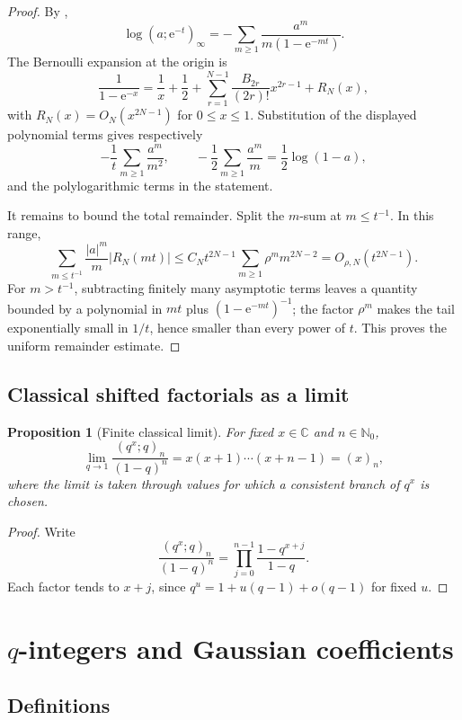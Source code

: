\documentclass[11pt,oneside,openany]{book}
\newtheorem{proposition}[theorem]{Proposition}
\theoremstyle{definition}
\theoremstyle{remark}
\newcommand{\C}{\mathbb C}
\newcommand{\N}{\mathbb N}
\newcommand{\e}{\mathrm e}
\newcommand{\abs}[1]{\lvert #1\rvert}
\begin{document}
\begin{proof}
By ,
\[
 \log(a;\e^{-t})_\infty
 =-\sum_{m\ge1}\frac{a^m}{m(1-\e^{-mt})}.
\]
The Bernoulli expansion at the origin is
\[
 \frac1{1-\e^{-x}}
 =\frac1x+\frac12+\sum_{r=1}^{N-1}
 \frac{B_{2r}}{(2r)!}x^{2r-1}+R_N(x),
\]
with $R_N(x)=O_N(x^{2N-1})$ for $0\le x\le1$.  Substitution of the displayed polynomial terms gives respectively
\[
 -\frac1t\sum_{m\ge1}\frac{a^m}{m^2},
 \qquad
 -\frac12\sum_{m\ge1}\frac{a^m}{m}=\frac12\log(1-a),
\]
and the polylogarithmic terms in the statement.

It remains to bound the total remainder.  Split the $m$-sum at $m\le t^{-1}$.  In this range,
\[
 \sum_{m\le t^{-1}}\frac{\abs a^m}{m}\abs{R_N(mt)}
 \le C_Nt^{2N-1}\sum_{m\ge1}\rho^m m^{2N-2}
 =O_{\rho,N}(t^{2N-1}).
\]
For $m>t^{-1}$, subtracting finitely many asymptotic terms leaves a quantity bounded by a polynomial in $mt$ plus $(1-\e^{-mt})^{-1}$; the factor $\rho^m$ makes the tail exponentially small in $1/t$, hence smaller than every power of $t$.  This proves the uniform remainder estimate.
\end{proof}

\section{Classical shifted factorials as a limit}

\begin{proposition}[Finite classical limit]\label{prop:classical-poch-limit}
For fixed $x\in\C$ and $n\in\N_0$,
\[
 \lim_{q\to1}\frac{(q^x;q)_n}{(1-q)^n}
 =x(x+1)\cdots(x+n-1)=(x)_n,
\]
where the limit is taken through values for which a consistent branch of $q^x$ is chosen.
\end{proposition}

\begin{proof}
Write
\[
 \frac{(q^x;q)_n}{(1-q)^n}
 =\prod_{j=0}^{n-1}\frac{1-q^{x+j}}{1-q}.
\]
Each factor tends to $x+j$, since $q^u=1+u(q-1)+o(q-1)$ for fixed $u$.
\end{proof}

\chapter{\texorpdfstring{$q$}{q}-integers and Gaussian coefficients}\label{chap:gaussian}

\section{Definitions}
\end{document}
